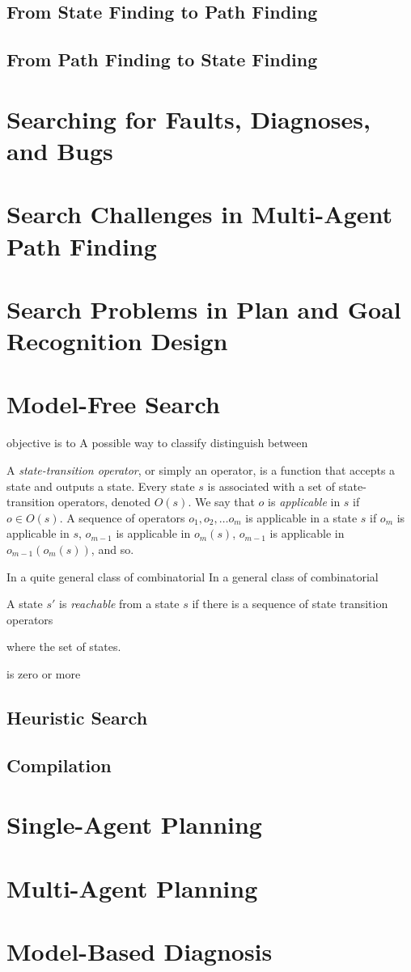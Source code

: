 \subsection{From State Finding to Path Finding}


\subsection{From Path Finding to State Finding}



\section{Searching for Faults, Diagnoses, and Bugs}

\section{Search Challenges in Multi-Agent Path Finding}

\section{Search Problems in Plan and Goal Recognition Design}

\section{Model-Free Search}


objective is to 
A possible way to classify distinguish between 



A \emph{state-transition operator}, or simply an operator, is a function that accepts a state and outputs a state. 
Every state $s$ is associated with a set of state-transition operators, denoted $O(s)$. 
We say that $o$ is \emph{applicable} in $s$ if $o\in O(s)$. 
A sequence of operators $o_1, o_2, \ldots o_m$ is applicable in a state $s$
if $o_m$ is applicable in $s$, 
$o_{m-1}$ is applicable in $o_m(s)$,
$o_{m-1}$ is applicable in $o_{m-1}(o_m(s))$, 
and so. 

In a quite general class of combinatorial 
In a general class of combinatorial 




A state $s'$ is \emph{reachable} from a state $s$ if there is a sequence of state transition operators 

where the set of states. 

is zero or more 


\subsection{Heuristic Search}

\subsection{Compilation}

\section{Single-Agent Planning}
\section{Multi-Agent Planning}
\section{Model-Based Diagnosis}
